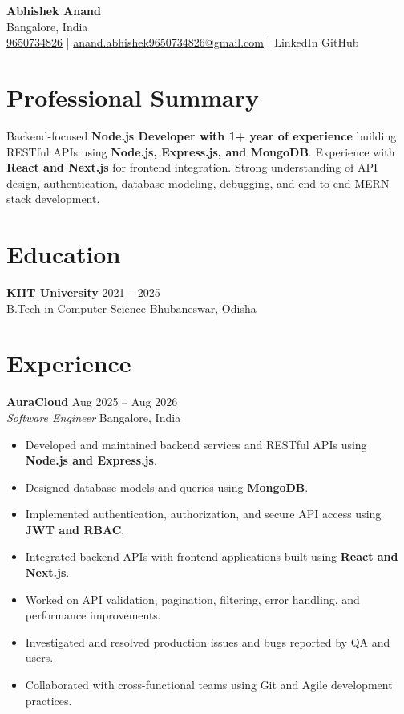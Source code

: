 \documentclass[9pt,a4paper]{article}
\begin{document}
\begin{center}
    {\Large \textbf{Abhishek Anand}} \\[-1pt]
    Bangalore, India \\[-2pt]
    \href{tel:9650734826}{9650734826} \quad | \quad
    \href{mailto:anand.abhishek9650734826@gmail.com}{anand.abhishek9650734826@gmail.com} \quad | \quad
    LinkedIn \quad GitHub
\end{center}

\vspace{-5pt}

\section*{Professional Summary}
Backend-focused \textbf{Node.js Developer with 1+ year of experience} building RESTful APIs using
\textbf{Node.js, Express.js, and MongoDB}. Experience with \textbf{React and Next.js} for frontend
integration. Strong understanding of API design, authentication, database modeling, debugging,
and end-to-end MERN stack development.

\section*{Education}
\textbf{KIIT University} \hfill 2021 -- 2025 \\
B.Tech in Computer Science \hfill Bhubaneswar, Odisha

\section*{Experience}

\textbf{AuraCloud} \hfill Aug 2025 -- Aug 2026 \\
\textit{Software Engineer} \hfill Bangalore, India
\begin{itemize}
    \item Developed and maintained backend services and RESTful APIs using \textbf{Node.js and Express.js}.
    \item Designed database models and queries using \textbf{MongoDB}.
    \item Implemented authentication, authorization, and secure API access using \textbf{JWT and RBAC}.
    \item Integrated backend APIs with frontend applications built using \textbf{React and Next.js}.
    \item Worked on API validation, pagination, filtering, error handling, and performance improvements.
    \item Investigated and resolved production issues and bugs reported by QA and users.
    \item Collaborated with cross-functional teams using Git and Agile development practices.
\end{itemize}
\end{document}
